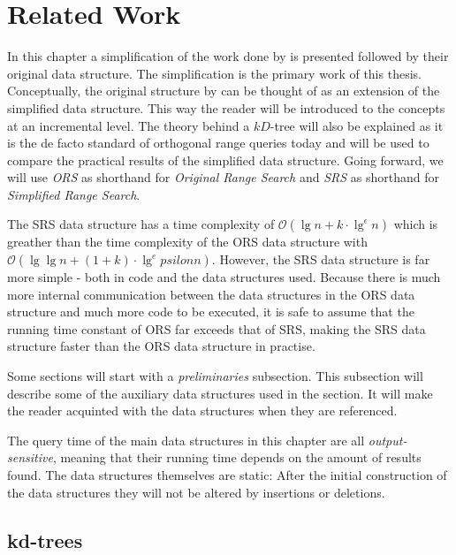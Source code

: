 \chapter{Related Work}
\label{ch:relatedwork}


In this chapter a simplification of the work done by \citet{chanetal} is presented followed by their original data structure. The simplification is the primary work of this thesis. Conceptually, the original structure by \citet{chanetal} can be thought of as an extension of the simplified data structure. This way the reader will be introduced to the concepts at an incremental level. The theory behind a $kD$-tree will also be explained as it is the de facto standard of orthogonal range queries today and will be used to compare the practical results of the simplified data structure.  Going forward, we will use \emph{ORS} as shorthand for \emph{Original Range Search} and \emph{SRS} as shorthand for \emph{Simplified Range Search}.

The SRS data structure has a time complexity of $\mathcal{O}(\lg n + k\cdot \lg^\epsilon n)$ which is greather than the time complexity of the ORS data structure with $\mathcal{O}(\lg \lg n + (1+k)\cdot \lg^epsilon n)$. However, the SRS data structure is far more simple - both in code and the data structures used. Because there is much more internal communication between the data structures in the ORS data structure and much more code to be executed, it is safe to assume that the running time constant of ORS far exceeds that of SRS, making the SRS data structure faster than the ORS data structure in practise. 

Some sections will start with a \emph{preliminaries} subsection. This subsection will describe some of the auxiliary data structures used in the section.  It will make the reader acquinted with the data structures when they are referenced.

The query time of the main data structures in this chapter are all \emph{output-sensitive}, meaning that their running time depends on the amount of results found. The data structures themselves are static: After the initial construction of the data structures they will not be altered by insertions or deletions.  

\section{kd-trees}
\label{sect:kdtrees}

